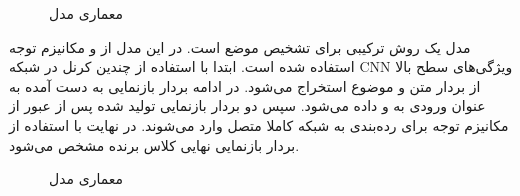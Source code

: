 \begin{figure}
	
	\caption[معماری مدل
	]{معماری مدل
	\cite{augenstein-etal-2016-stance}}
	\label{bicond}
\end{figure}

مدل
\cite{siddiqua-etal-2019-tweet}
یک روش ترکیبی برای تشخیص موضع است. در این مدل از
و مکانیزم توجه استفاده شده است. ابتدا با استفاده از چندین کرنل در شبکه CNN ویژگی‌های سطح بالا از بردار متن و موضوع استخراج می‌شود. در ادامه بردار بازنمایی به دست آمده به عنوان ورودی به 
و
داده می‌شود. سپس دو بردار بازنمایی تولید شده پس از عبور از مکانیزم توجه برای ردە‌بندی به شبکه کاملا متصل وارد می‌شوند. در نهایت با استفاده از بردار بازنمایی نهایی کلاس برنده مشخص می‌شود.

\begin{figure}
	
	\caption[معماری مدل
	]{معماری مدل
		\cite{siddiqua-etal-2019-tweet}}
	\label{PNEM}
\end{figure}

